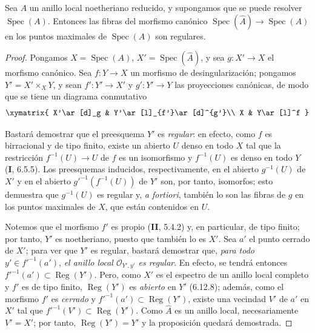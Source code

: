 \begin{proposition}[7.9.3]
\label{IV.2.s7.9.3-fr}
Sea $A$ un anillo local noetheriano reducido, y supongamos que se puede
resolver $\operatorname{Spec}(A)$. Entonces las fibras del morfismo
canónico $\operatorname{Spec}(\widehat A)\to\operatorname{Spec}(A)$
en los puntos maximales de $\operatorname{Spec}(A)$ son regulares.
\end{proposition}

\begin{proof}
Pongamos $X=\operatorname{Spec}(A)$, $X'=\operatorname{Spec}(\widehat A)$,
y sea $g:X'\to X$ el morfismo canónico. Sea $f:Y\to X$ un morfismo
de desingularización; pongamos $Y'=X'\times_XY$, y sean
$f':Y'\to X'$ y $g':Y'\to Y$ las proyecciones canónicas, de modo que
se tiene un diagrama conmutativo
\[
\xymatrix{
X'\ar[d]_g & Y'\ar[l]_{f'}\ar[d]^{g'}\\
X & Y\ar[l]^f
}
\]

Bastará demostrar que el preesquema $Y'$ es \emph{regular}: en efecto,
como $f$ es birracional y de tipo finito, existe un abierto $U$ denso
en todo $X$ tal que la restricción $f^{-1}(U)\to U$ de $f$ es un
isomorfismo y $f^{-1}(U)$ es denso en todo $Y$ (\textbf{I}, 6.5.5).
Los preesquemas inducidos, respectivamente, en el abierto $g^{-1}(U)$
de $X'$ y en el abierto $g'^{-1}(f^{-1}(U))$ de $Y'$ son, por tanto,
isomorfos; esto demuestra que $g^{-1}(U)$ es regular y, \emph{a fortiori},
también lo son las fibras de $g$ en los puntos maximales de $X$,
que están contenidos en $U$.


Notemos que el morfismo $f'$ es propio (\textbf{II}, 5.4.2) y, en
particular, de tipo finito; por tanto, $Y'$ es noetheriano, puesto que
también lo es $X'$. Sea $a'$ el punto cerrado de $X'$; para ver que $Y'$
es regular, bastará demostrar que, \emph{para todo} $y'\in f'^{-1}(a')$,
\emph{el anillo local $\mathcal O_{Y',y'}$ es regular}. En efecto,
se tendrá entonces $f'^{-1}(a')\subset\operatorname{Reg}(Y')$.
Pero, como $X'$ es el espectro de un anillo local completo y $f'$ es
de tipo finito, $\operatorname{Reg}(Y')$ es \emph{abierto} en $Y'$
(6.12.8); además, como el morfismo $f'$ es \emph{cerrado} y
$f'^{-1}(a')\subset\operatorname{Reg}(Y')$, existe una vecindad $V'$
de $a'$ en $X'$ tal que $f'^{-1}(V')\subset\operatorname{Reg}(Y')$.
Como $\widehat A$ es un anillo local, necesariamente $V'=X'$;
por tanto, $\operatorname{Reg}(Y')=Y'$ y la proposición quedará
demostrada.


\end{proof}
